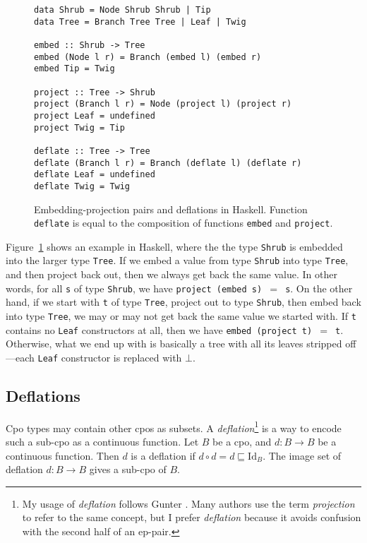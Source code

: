\documentclass{llncs}
\begin{document}
\begin{figure}
\begin{verbatim}
data Shrub = Node Shrub Shrub | Tip
data Tree = Branch Tree Tree | Leaf | Twig

embed :: Shrub -> Tree
embed (Node l r) = Branch (embed l) (embed r)
embed Tip = Twig

project :: Tree -> Shrub
project (Branch l r) = Node (project l) (project r)
project Leaf = undefined
project Twig = Tip

deflate :: Tree -> Tree
deflate (Branch l r) = Branch (deflate l) (deflate r)
deflate Leaf = undefined
deflate Twig = Twig
\end{verbatim}
\caption{\label{fig:ep-pair}Embedding-projection pairs and deflations
  in Haskell.  Function \texttt{deflate} is equal to the composition
  of functions \texttt{embed} and \texttt{project}.}
\end{figure}

Figure~\ref{fig:ep-pair} shows an example in Haskell, where the the
type \texttt{Shrub} is embedded into the larger type \texttt{Tree}.
If we embed a value from type \texttt{Shrub} into type \texttt{Tree},
and then project back out, then we always get back the same value.  In
other words, for all \texttt{s} of type \texttt{Shrub}, we have
\texttt{project (embed s) $=$ s}.  On the other hand, if we start with
\texttt{t} of type \texttt{Tree}, project out to type \texttt{Shrub},
then embed back into type \texttt{Tree}, we may or may not get back
the same value we started with.  If \texttt{t} contains no
\texttt{Leaf} constructors at all, then we have \texttt{embed (project
  t) $=$ t}.  Otherwise, what we end up with is basically a tree with
all its leaves stripped off---each \texttt{Leaf} constructor is
replaced with $\bot$.

\subsection{Deflations}

Cpo types may contain other cpos as subsets.  A
\emph{deflation}\footnote{My usage of \emph{deflation} follows Gunter
  \cite{gunter85thesis}.  Many authors use the term \emph{projection}
  to refer to the same concept, but I prefer \emph{deflation} because
  it avoids confusion with the second half of an ep-pair.} is a way to
encode such a sub-cpo as a continuous function.  Let $B$ be a cpo, and
$d : B \rightarrow B$ be a continuous function.  Then $d$ is a
deflation if $d \circ d = d \sqsubseteq \mathrm{Id}_B$.  The image set
of deflation $d : B \rightarrow B$ gives a sub-cpo of $B$.
\end{document}
